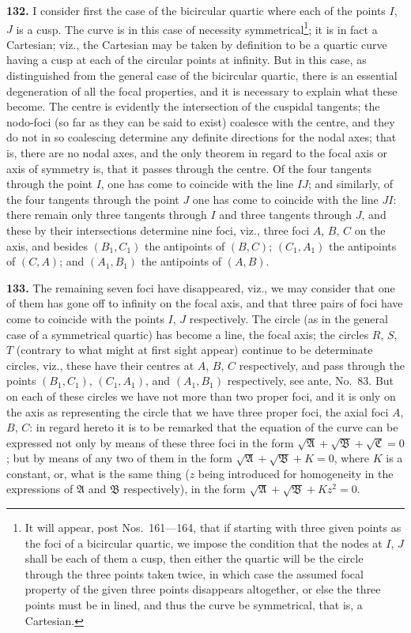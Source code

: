 \documentclass[12pt,a4paper]{article}
\theoremstyle{definition}
\begin{document}
\newpage
\noindent\textbf{132.} I consider first the case of the bicircular quartic where each of the points
$I$, $J$ is a cusp. The curve is in this case of necessity symmetrical\footnote{It will appear, post Nos.~161---164, that if starting with three given points as the foci of a bicircular
quartic, we impose the condition that the nodes at $I$, $J$ shall be each of them a cusp, then either the
quartic will be the circle through the three points taken twice, in which case the assumed focal property of
the given three points disappears altogether, or else the three points must be in lined, and thus the curve be
symmetrical, that is, a Cartesian.}; it is in fact
a Cartesian; viz., the Cartesian may be taken by definition to be a quartic curve
having a cusp at each of the circular points at infinity. But in this case, as distinguished from the general case of the bicircular quartic, there is an essential
degeneration of all the focal properties, and it is necessary to explain what these
become. The centre is evidently the intersection of the cuspidal tangents; the nodo-foci (so far as they can be said to exist) coalesce with the centre, and they do not
in so coalescing determine any definite directions for the nodal axes; that is, there
are no nodal axes, and the only theorem in regard to the focal axis or axis of
symmetry is, that it passes through the centre. Of the four tangents through the
point $I$, one has come to coincide with the line $IJ$; and similarly, of the four
tangents through the point $J$ one has come to coincide with the line $JI$: there
remain only three tangents through $I$ and three tangents through $J$, and these by
their intersections determine nine foci, viz., three foci $A$, $B$, $C$ on the axis, and besides
$(B_1, C_1)$ the antipoints of $(B, C)$; $(C_1, A_1)$ the antipoints of $(C, A)$; and $(A_1, B_1)$ the
antipoints of $(A, B)$.

\noindent\textbf{133.} The remaining seven foci have disappeared, viz., we may consider that one
of them has gone off to infinity on the focal axis, and that three pairs of foci have
come to coincide with the points $I$, $J$ respectively. The circle (as in the general
case of a symmetrical quartic) has become a line, the focal axis; the circles $R$, $S$, $T$
(contrary to what might at first sight appear) continue to be determinate circles, viz.,
these have their centres at $A$, $B$, $C$ respectively, and pass through the points $(B_1, C_1)$,
$(C_1, A_1)$, and $(A_1, B_1)$ respectively, see ante, No.~83. But on each of these circles we
have not more than two proper foci, and it is only on the axis as representing the
circle that we have three proper foci, the axial foci $A$, $B$, $C$: in regard hereto it
is to be remarked that the equation of the curve can be expressed not only by
means of these three foci in the form $\sqrt{\mathfrak{A}} + \sqrt{\mathfrak{B}} + \sqrt{\mathfrak{C}} = 0$; but by means of any
two of them in the form $\sqrt{\mathfrak{A}} + \sqrt{\mathfrak{B}} + K = 0$, where $K$ is a constant, or, what is the
same thing ($z$ being introduced for homogeneity in the expressions of $\mathfrak{A}$ and $\mathfrak{B}$
respectively), in the form $\sqrt{\mathfrak{A}} + \sqrt{\mathfrak{B}} + Kz^2 = 0$.
\end{document}
